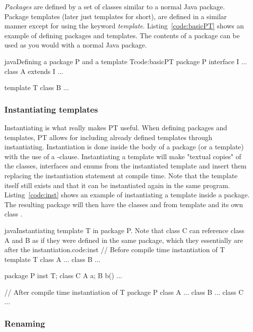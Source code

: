 \emph{Packages} are defined by a set of classes similar to a normal Java package.
Package templates (later just templates for short), are defined in a similar manner except for using the keyword \emph{template}.
Listing~\vref{code:basicPT} shows an example of defining packages and templates.
The contents of a package can be used as you would with a normal Java package.

\begin{code}{java}{Defining a package P and a template T}{code:basicPT}
    package P {
        interface I { ... }
        class A extends I { ... }
    }

    template T {
        class B { ... }
    }
\end{code}

\subsubsection{Instantiating templates}\label{subsubsec:inst}
Instantiating is what really makes PT useful.
When defining packages and templates, PT allows for including already defined templates through instantiating.
Instantiation is done inside the body of a package (or a template) with the use of a -clause.
Instantiating a template will make "textual copies" of the  classes, interfaces and enums from the instantiated template and insert them replacing the instantiation statement at compile time.
Note that the template itself still exists and that it can be instantiated again in the same program.
Listing~\vref{code:inst} shows an example of instantiating a template inside a package.
The resulting package  will then have the classes  and  from template  and its own class .

\begin{code}{java}{Instantiating template T in package P. Note that class C can reference class A and B as if they were defined in the same package, which they essentially are after the instantiation.}{code:inst}
// Before compile time instantiation of T
template T {
    class A { ... }
    class B { ... }
}

package P {
    inst T;
    class C {
        A a;
        B b() {
            ...
        }
    }
}

// After compile time instantiation of T
package P {
    class A { ... }
    class B { ... }
    class C { ... }
}
\end{code}

\subsubsection{Renaming}\label{subsubsec:renaming}

